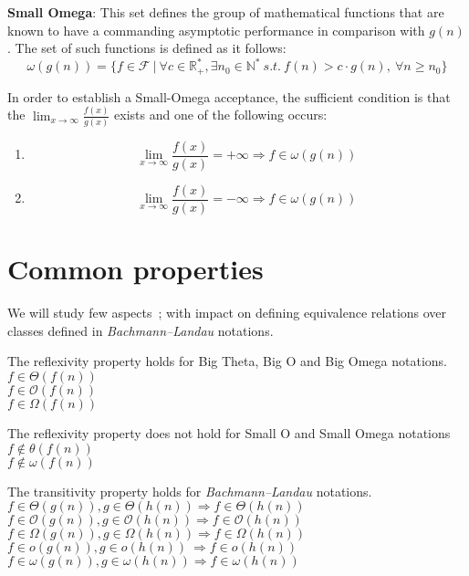 \begin{definition}   
 \textbf{Small Omega}:
  This set defines the group of mathematical functions that are known to have a commanding asymptotic performance in comparison with  $g(n)$.
  The set of such functions is defined as it follows:
  \[\omega(g(n)) = \lbrace f \in \mathcal{F}\ |\ \forall c \in \mathbb{R}^{*}_{+}, \exists n_{0} \in \mathbb{N}^{*}\ s.t.\  f(n) > c \cdot g(n),\  \forall n \geq n_{0} \rbrace\]
  \end{definition}  
  \begin{lemma}
In order to establish a Small-Omega acceptance, the sufficient condition is that the $ \lim_{x\to\infty} \frac{f(x)}{g(x)}$ exists and one of the following occurs:
    \begin{enumerate}[label=(\roman*)]
  \item \[  \lim_{x\to\infty} \frac{f(x)}{g(x)} = +\infty \Rightarrow f \in \omega(g(n))\ \]   
 \item  \[  \lim_{x\to\infty} \frac{f(x)}{g(x)} = -\infty \Rightarrow f \in \omega(g(n))\ \]  
	\end{enumerate}
  \end{lemma}

\section{Common properties}
We will study few aspects~\cite{mogocs2015new};
 with impact on defining equivalence relations over classes defined in \textit{Bachmann–Landau} notations.
 \hfill\break
 \begin{theorem} The reflexivity property holds for Big Theta, Big O and Big Omega notations.  \\  $ f \in \Theta(f(n)) $ \\$ f \in \mathcal{O}(f(n)) $ \\$ f \in \Omega(f(n)) $
 \end{theorem}

\begin{remark} The reflexivity property does not hold for Small O and Small Omega notations \\
 $ f \notin \theta(f(n)) $ \\$ f \notin \omega(f(n)) $ 
\end{remark}

\begin{theorem} The transitivity property holds for \textit{Bachmann–Landau} notations.  \\  $ f \in \Theta(g(n)),  g \in \Theta(h(n)) \Rightarrow  f \in \Theta(h(n))$ \\
 $ f \in \mathcal{O}(g(n)),  g \in \mathcal{O}(h(n)) \Rightarrow  f \in \mathcal{O}(h(n))$ \\
 $ f \in \Omega(g(n)),  g \in \Omega(h(n)) \Rightarrow  f \in \Omega(h(n))$ \\
 $ f \in o(g(n)),  g \in o(h(n)) \  \Rightarrow  f \in o(h(n))$ \\
 $ f \in \omega(g(n)),  g \in \omega(h(n)) \Rightarrow  f \in \omega(h(n))$
\end{theorem} 

